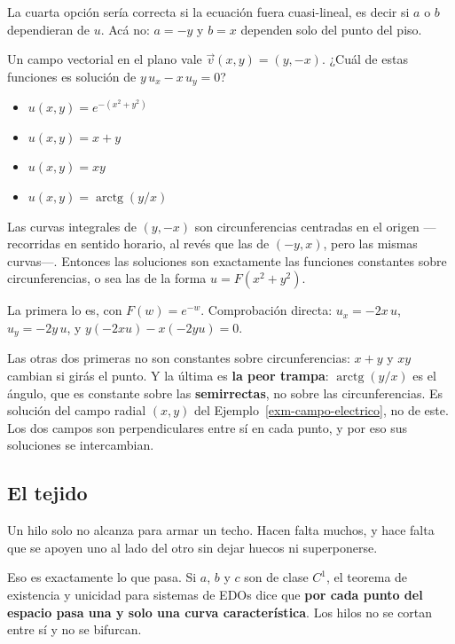 \documentclass[
  spanish,
  a4paper,
]{scrbook}
\providecommand{\tightlist}{%
  \setlength{\itemsep}{0pt}\setlength{\parskip}{0pt}}
\theoremstyle{definition}
\theoremstyle{plain}
\theoremstyle{definition}
\theoremstyle{plain}
\theoremstyle{definition}
\theoremstyle{remark}
\begin{document}
La cuarta opción sería correcta si la ecuación fuera cuasi-lineal, es
decir si \(a\) o \(b\) dependieran de \(u\). Acá no: \(a=-y\) y \(b=x\)
dependen solo del punto del piso.

Un campo vectorial en el plano vale \(\vec v(x,y) = (y, -x)\). ¿Cuál de
estas funciones es solución de \(y\,u_x - x\,u_y = 0\)?

\begin{itemize}
\tightlist
\item
  {\(u(x,y) = e^{-(x^2+y^2)}\)}
\item
  {\(u(x,y) = x + y\)}
\item
  {\(u(x,y) = xy\)}
\item
  {\(u(x,y) = \operatorname{arctg}(y/x)\)}
\end{itemize}

Las curvas integrales de \((y,-x)\) son circunferencias centradas en el
origen ---recorridas en sentido horario, al revés que las de \((-y,x)\),
pero las mismas curvas---. Entonces las soluciones son exactamente las
funciones constantes sobre circunferencias, o sea las de la forma
\(u = F(x^2+y^2)\).

La primera lo es, con \(F(w) = e^{-w}\). Comprobación directa:
\(u_x = -2x\,u\), \(u_y = -2y\,u\), y \(y(-2xu) - x(-2yu) = 0\).

Las otras dos primeras no son constantes sobre circunferencias: \(x+y\)
y \(xy\) cambian si girás el punto. Y la última es \textbf{la peor
trampa}: \(\operatorname{arctg}(y/x)\) es el ángulo, que es constante
sobre las \textbf{semirrectas}, no sobre las circunferencias. Es
solución del campo radial \((x,y)\) del
Ejemplo~\ref{exm-campo-electrico}, no de este. Los dos campos son
perpendiculares entre sí en cada punto, y por eso sus soluciones se
intercambian.

\subsection{El tejido}\label{sec-tejido}

Un hilo solo no alcanza para armar un techo. Hacen falta muchos, y hace
falta que se apoyen uno al lado del otro sin dejar huecos ni
superponerse.

Eso es exactamente lo que pasa. Si \(a\), \(b\) y \(c\) son de clase
\(C^1\), el teorema de existencia y unicidad para sistemas de EDOs dice
que \textbf{por cada punto del espacio pasa una y solo una curva
característica}. Los hilos no se cortan entre sí y no se bifurcan.
\end{document}
